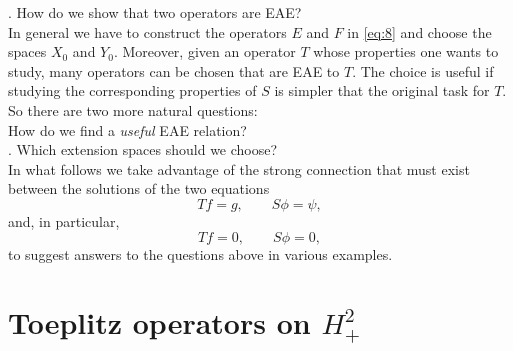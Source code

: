 \documentclass[11pt]{article}
\begin{document}
. How do we show that two operators are EAE?\\

In general we have to construct the operators $E$ and $F$ in \eqref{eq:8} and choose the spaces $X_0$ and $Y_0$. Moreover,
given an operator $T$ whose properties one wants to study, many operators can be chosen that
are EAE to $T$. The choice is useful if studying the corresponding properties
of $S$ is simpler that the original task for $T$. So there are two more natural questions:\\

 How do we find a {\em useful\/} EAE relation?\\

. Which extension spaces should we choose?\\

In what follows we take advantage of the strong connection that must exist between the solutions of the two equations
\[
Tf=g, \qquad S\phi=\psi,
\]
and, in particular,
\[
Tf=0, \qquad S\phi=0,
\]
to suggest answers to the questions above in various examples.

\section{Toeplitz operators on $H^2_+$}
\end{document}
